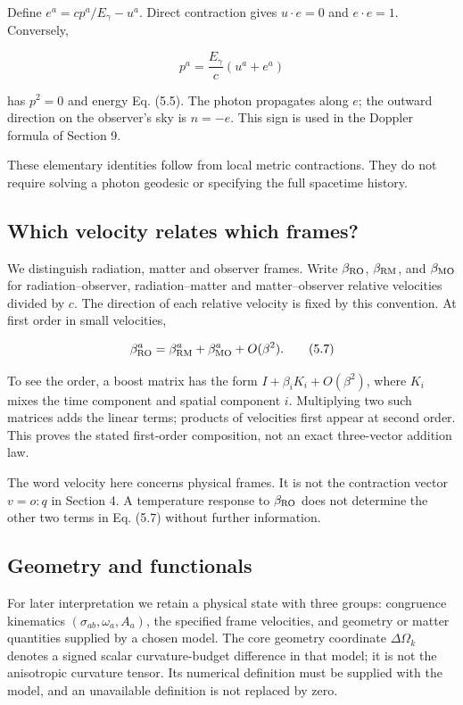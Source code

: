 \documentclass[
  11pt,
  a4paper]{article}
\begin{document}
Define \(e^a=cp^a/E_\gamma-u^a\). Direct contraction gives \(u\cdot e=0\) and \(e\cdot e=1\). Conversely,

\[
p^a=\frac{E_\gamma}{c}(u^a+e^a)
\tag{5.6}
\]

has \(p^2=0\) and energy Eq. (5.5). The photon propagates along \(e\); the outward direction on the observer's sky is \(n=-e\). This sign is used in the Doppler formula of Section 9.

These elementary identities follow from local metric contractions. They do not require solving a photon geodesic or specifying the full spacetime history.

\hypertarget{which-velocity-relates-which-frames}{%
\subsection{Which velocity relates which frames?}\label{which-velocity-relates-which-frames}}

We distinguish radiation, matter and observer frames. Write \(\beta_{\rm RO}\), \(\beta_{\rm RM}\), and \(\beta_{\rm MO}\) for radiation--observer, radiation--matter and matter--observer relative velocities divided by \(c\). The direction of each relative velocity is fixed by this convention. At first order in small velocities,

\[
\beta_{\rm RO}^a=\beta_{\rm RM}^a+\beta_{\rm MO}^a+O(\beta^2).
\tag{5.7}
\]

To see the order, a boost matrix has the form \(I+\beta_iK_i+O(\beta^2)\), where \(K_i\) mixes the time component and spatial component \(i\). Multiplying two such matrices adds the linear terms; products of velocities first appear at second order. This proves the stated first-order composition, not an exact three-vector addition law.

The word velocity here concerns physical frames. It is not the contraction vector \(v=o:q\) in Section 4. A temperature response to \(\beta_{\rm RO}\) does not determine the other two terms in Eq. (5.7) without further information.

\hypertarget{geometry-and-functionals}{%
\subsection{Geometry and functionals}\label{geometry-and-functionals}}

For later interpretation we retain a physical state with three groups: congruence kinematics \((\sigma_{ab},\omega_a,A_a)\), the specified frame velocities, and geometry or matter quantities supplied by a chosen model. The core geometry coordinate \(\Delta\Omega_k\) denotes a signed scalar curvature-budget difference in that model; it is not the anisotropic curvature tensor. Its numerical definition must be supplied with the model, and an unavailable definition is not replaced by zero.
\end{document}
